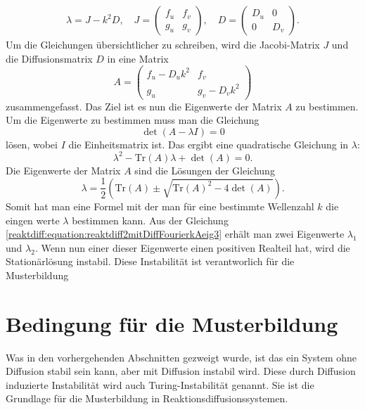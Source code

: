 \begin{align}
    \label{reaktdiff:equation:reaktdiff2mitDiffFourierk}
    \lambda = J - k^2 D, \quad 
    J =
    \begin{pmatrix}
        f_u & f_v\\
        g_u & g_v
    \end{pmatrix}, \quad
    D =
    \begin{pmatrix}
        D_u & 0\\
        0 & D_v
    \end{pmatrix}.
\end{align}
Um die Gleichungen übersichtlicher zu schreiben, wird die Jacobi-Matrix \(J\) und die Diffusionsmatrix \(D\) in eine Matrix
\begin{equation}
    \label{reaktdiff:equation:reaktdiff2mitDiffFourierkA}
    A =
    \begin{pmatrix}
        f_u - D_u k^2 & f_v\\
        g_u & g_v - D_v k^2
    \end{pmatrix}
\end{equation}
zusammengefasst.
Das Ziel ist es nun die Eigenwerte der Matrix \(A\) zu bestimmen.
Um die Eigenwerte zu bestimmen muss man die Gleichung
\begin{equation}
    \det(A - \lambda I) = 0
\label{reaktdiff:equation:reaktdiff2mitDiffFourierkAeig}
\end{equation}
lösen, wobei \(I\) die Einheitsmatrix ist.
Das ergibt eine quadratische Gleichung in \(\lambda\):
\begin{equation}
    \lambda^2 - \text{Tr}(A) \lambda + \det(A) = 0.
\label{reaktdiff:equation:reaktdiff2mitDiffFourierkAeig2}
\end{equation}
Die Eigenwerte der Matrix \(A\) sind die Lösungen der Gleichung
\begin{equation}
    \lambda = \frac{1}{2} \left( \text{Tr}(A) \pm 
    \sqrt{\text{Tr}(A)^2 - 4 \det(A)} \right).
\label{reaktdiff:equation:reaktdiff2mitDiffFourierkAeig3}
\end{equation}
Somit hat man eine Formel mit der man für eine bestimmte Wellenzahl \(k\) die eingen werte \(\lambda\) bestimmen kann.
Aus der Gleichung \ref{reaktdiff:equation:reaktdiff2mitDiffFourierkAeig3} erhält man zwei Eigenwerte \(\lambda_1\) und \(\lambda_2\).
Wenn nun einer dieser Eigenwerte einen positiven Realteil hat, wird die Stationärlösung instabil.
Diese Instabilität ist verantworlich für die Musterbildung


\section{Bedingung für die Musterbildung
\label{reaktdiff:section:diffusioninduzierteInstabilitaet}}
Was in den vorhergehenden Abschnitten gezweigt wurde, ist das ein System ohne Diffusion stabil sein kann, aber mit Diffusion instabil wird.
Diese durch Diffusion induzierte Instabilität wird auch Turing-Instabilität genannt.
Sie ist die Grundlage für die Musterbildung in Reaktionsdiffusionssystemen.

